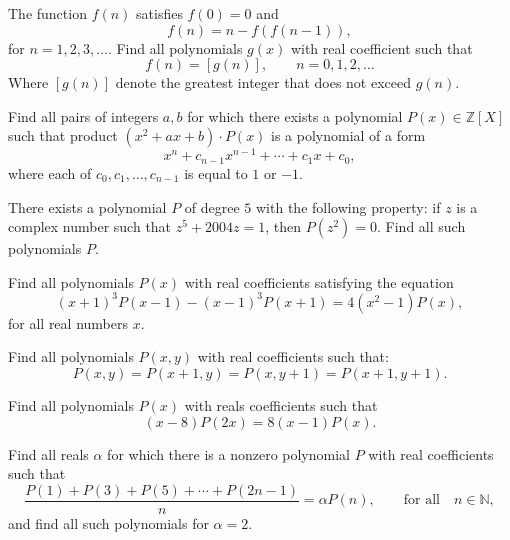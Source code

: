 \begin{question}
The function $f(n)$ satisfies $f(0)=0$ and \[f(n)=n-f \left( f(n-1) \right),\] for $n=1,2,3, \dots$. Find all polynomials $g(x)$ with real coefficient such that
\[ f(n)= [ g(n) ], \qquad n=0,1,2, \dots \]
Where $[ g(n) ]$ denote the greatest integer that does not exceed $g(n)$.
\end{question}





\begin{question}
Find all pairs of integers $a,b$ for which there exists a polynomial $P(x) \in \mathbb{Z}[X]$ such that product $(x^2+ax+b)\cdot P(x)$ is a polynomial of a form \[ x^n+c_{n-1}x^{n-1}+\cdots+c_1x+c_0,  \] where each of $c_0,c_1,\dots,c_{n-1}$ is equal to $1$ or $-1$.
\end{question}





\begin{question}
There exists a polynomial $P$ of degree $5$ with the following property: if $z$ is a complex number such that $z^{5}+2004z=1$, then $P(z^{2})=0$. Find all such polynomials $P$.
\end{question}





\begin{question}
Find all polynomials $P(x)$ with real coefficients satisfying the equation \[(x+1)^{3}P(x-1)-(x-1)^{3}P(x+1)=4(x^{2}-1) P(x),\] for all real numbers $x$.
\end{question}


\begin{question}
Find all polynomials $P(x,y)$ with real coefficients such that:
\[P(x,y)=P(x+1,y)=P(x,y+1)=P(x+1,y+1).\]
\end{question}




\begin{question}
Find all polynomials $ P(x)$ with reals coefficients such that
\[(x-8)P(2x)=8(x-1)P(x).\]
\end{question}


\begin{question}
Find all reals $ \alpha$ for which there is a nonzero polynomial $P$ with real coefficients such that 
\[\frac{P(1)+P(3)+P(5)+\cdots+P(2n-1)}{n}=\alpha P(n), \qquad \text{for all} \quad n \in \mathbb N,\]
and find all such polynomials for $\alpha=2$.
\end{question}





